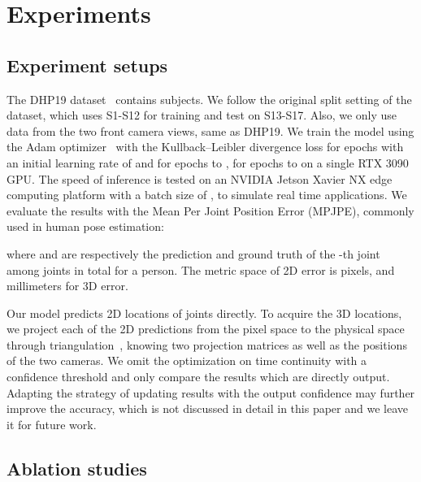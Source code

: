 \documentclass[10pt,twocolumn,letterpaper]{article}
\begin{document}
\section{Experiments}

\subsection{Experiment setups}

The DHP19 dataset~\cite{calabrese2019dhp19} contains  subjects.
We follow the original split setting of the dataset, which uses S1-S12 for training and test on S13-S17.
Also, we only use data from the two front camera views, same as DHP19.
We train the model using the Adam optimizer~\cite{kingma2014adam} with the Kullback–Leibler divergence loss for  epochs with an initial learning rate of  and  for epochs  to ,  for epochs  to  on a single RTX 3090 GPU. The speed of inference is tested on an NVIDIA Jetson Xavier NX edge computing platform with a batch size of , to simulate real time applications. We evaluate the results with the Mean Per Joint Position Error (MPJPE), commonly used in human pose estimation:

where  and  are respectively the prediction and ground truth of the -th joint among  joints in total for a person. The metric space of 2D error is pixels, and millimeters for 3D error.

Our model predicts 2D locations of joints directly.
To acquire the 3D locations, we project each of the 2D predictions from the pixel space to the physical space through triangulation~\cite{calabrese2019dhp19}, knowing two projection matrices as well as the positions of the two cameras. We omit the optimization on time continuity with a confidence threshold and only compare the results which are directly output.
Adapting the strategy of updating results with the output confidence may further improve the accuracy, which is not discussed in detail in this paper and we leave it for future work.

\subsection{Ablation studies}
\label{sec:ablation_studies}
\end{document}
